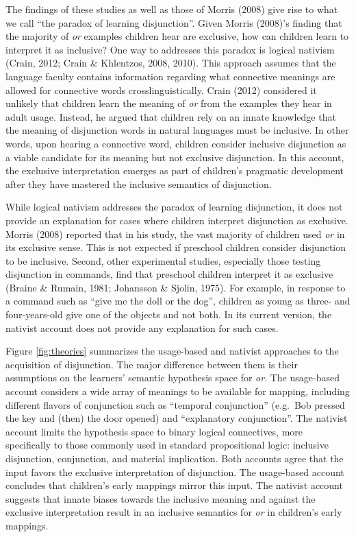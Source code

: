 \documentclass[,man,floatsintext]{apa6}
\begin{document}
The findings of these studies as well as those of Morris (2008) give rise to what we call \enquote{the paradox of learning disjunction}. Given Morris (2008)'s finding that the majority of \emph{or} examples children hear are exclusive, how can children learn to interpret it as inclusive? One way to addresses this paradox is logical nativism (Crain, 2012; Crain \& Khlentzos, 2008, 2010). This approach assumes that the language faculty contains information regarding what connective meanings are allowed for connective words crosslinguistically. Crain (2012) considered it unlikely that children learn the meaning of \emph{or} from the examples they hear in adult usage. Instead, he argued that children rely on an innate knowledge that the meaning of disjunction words in natural languages must be inclusive. In other words, upon hearing a connective word, children consider inclusive disjunction as a viable candidate for its meaning but not exclusive disjunction. In this account, the exclusive interpretation emerges as part of children's pragmatic development after they have mastered the inclusive semantics of disjunction.

While logical nativism addresses the paradox of learning disjunction, it does not provide an explanation for cases where children interpret disjunction as exclusive. Morris (2008) reported that in his study, the vast majority of children used \emph{or} in its exclusive sense. This is not expected if preschool children consider disjunction to be inclusive. Second, other experimental studies, especially those testing disjunction in commands, find that preschool children interpret it as exclusive (Braine \& Rumain, 1981; Johansson \& Sjolin, 1975). For example, in response to a command such as \enquote{give me the doll or the dog}, children as young as three- and four-years-old give one of the objects and not both. In its current version, the nativist account does not provide any explanation for such cases.

Figure \ref{fig:theories} summarizes the usage-based and nativist approaches to the acquisition of disjunction. The major difference between them is their assumptions on the learners' semantic hypothesis space for \emph{or}. The usage-based account considers a wide array of meanings to be available for mapping, including different flavors of conjunction such as \enquote{temporal conjunction} (e.g.~Bob pressed the key and (then) the door opened) and \enquote{explanatory conjunction}. The nativist account limits the hypothesis space to binary logical connectives, more specifically to those commonly used in standard propositional logic: inclusive disjunction, conjunction, and material implication. Both accounts agree that the input favors the exclusive interpretation of disjunction. The usage-based account concludes that children's early mappings mirror this input. The nativist account suggests that innate biases towards the inclusive meaning and against the exclusive interpretation result in an inclusive semantics for \emph{or} in children's early mappings.
\end{document}
